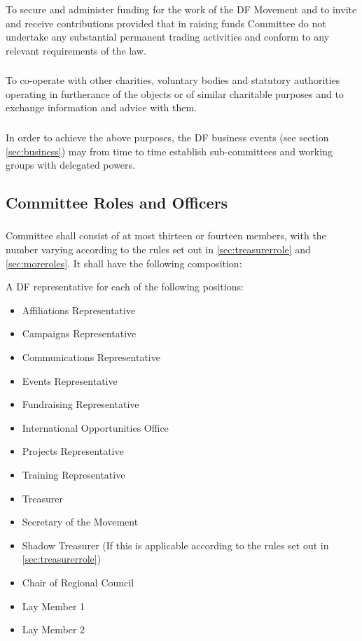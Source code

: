 \documentclass[a4paper, 12pt]{report}
\begin{document}
\subsubsection{}
To secure and administer funding for the work of the DF Movement and to invite and receive contributions provided that in raising funds Committee do not undertake any substantial permanent trading activities and conform to any relevant requirements of the law.
\subsubsection{}
To co-operate with other charities, voluntary bodies and statutory authorities operating in furtherance of the objects or of similar charitable purposes and to exchange information and advice with them.
\subsubsection{}
In order to achieve the above purposes, the DF business events (see section \ref{sec:business}) may from time to time establish sub-committees and working groups with delegated powers.

\subsection{Committee Roles and Officers}
\subsubsection{}
\label{sec:cttemembership}
Committee shall consist of at most thirteen or fourteen members, with the number varying according to the rules set out in \ref{sec:treasurerrole} and \ref{sec:moreroles}. It shall have the following composition:

A DF representative for each of the following positions:
\begin{itemize}
\item Affiliations Representative
\item Campaigns Representative
\item Communications Representative
\item Events Representative
\item Fundraising Representative
\item International Opportunities Office
\item Projects Representative
\item Training Representative
\item Treasurer
\item Secretary of the Movement
\item Shadow Treasurer (If this is applicable according to the rules set out in \ref{sec:treasurerrole})
\item Chair of Regional Council
\item Lay Member 1
\item Lay Member 2
\end{itemize}
\end{document}
